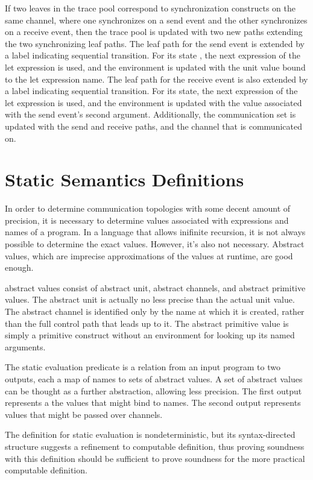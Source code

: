 \documentclass{article}
\begin{document}
If two leaves in the trace pool correspond to synchronization constructs on the same channel,
where one synchronizes on a send event and the other synchronizes on a receive event, then the
trace pool is updated with two new paths extending the two synchronizing leaf paths.  The leaf
path for the send event is extended by a label indicating sequential transition.  For its state
, the next expression of the let expression is used, and the environment is updated with the
unit value bound to the let expression name.  The leaf path for the receive event is also
extended by a label indicating sequential transition.  For its state, the next expression of
the let expression is used, and the environment is updated with the value associated with the
send event's second argument.   Additionally, the communication set is updated with the send
and receive paths, and the channel that is communicated on. 



\section{Static Semantics Definitions}

In order to determine communication topologies with some decent amount of precision, it is
necessary to determine values associated with expressions and names of a program.  In a
language that allows inifinite recursion, it is not always possible to determine the exact
values.  However, it's also not necessary.  Abstract values, which are imprecise approximations
of the values at runtime, are good enough.

abstract values consist of abstract unit, abstract channels, and abstract primitive values.
The abstract unit is actually no less precise than the actual unit value.  The abstract channel
is identified only by the name at which it is created, rather than the full control path that
leads up to it.  The abstract primitive value is simply a primitive construct without an
environment for looking up its named arguments. 

The static evaluation predicate is a relation from an input program to two outputs, each a map
of names to sets of abstract values.  A set of abstract values can be thought as a further
abstraction, allowing less precision. The first output represents a the values that might bind
to names.  The second output represents values that might be passed over channels.

The definition for static evaluation is nondeterministic, but its syntax-directed structure
suggests a refinement to computable definition, thus proving soundness with this definition
should be sufficient to prove soundness for the more practical computable definition.
\end{document}
